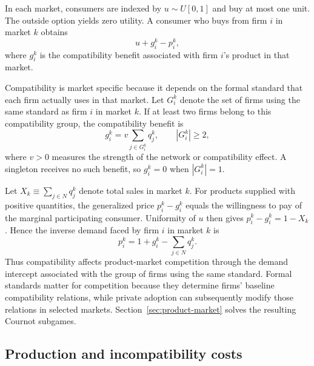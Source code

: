 In each market, consumers are indexed by $u\sim U[0,1]$ and buy at most one unit. The outside option yields zero utility. A consumer who buys from firm $i$ in market $k$ obtains
\begin{equation}
    u+g_i^k-p_i^k,
    \label{eq:consumer-utility}
\end{equation}
where $g_i^k$ is the compatibility benefit associated with firm $i$'s product in that market.

Compatibility is market specific because it depends on the formal standard that each firm actually uses in that market. Let $G_i^k$ denote the set of firms using the same standard as firm $i$ in market $k$. If at least two firms belong to this compatibility group, the compatibility benefit is
\begin{equation}
    g_i^k
    =v\sum_{j\in G_i^k}q_j^k,
    \qquad |G_i^k|\ge 2,
    \label{eq:compatibility-benefit}
\end{equation}
where $v>0$ measures the strength of the network or compatibility effect. A singleton receives no such benefit, so $g_i^k=0$ when $|G_i^k|=1$.

Let $X_k\equiv\sum_{j\in N}q_j^k$ denote total sales in market $k$. For products supplied with positive quantities, the generalized price $p_i^k-g_i^k$ equals the willingness to pay of the marginal participating consumer. Uniformity of $u$ then gives $p_i^k-g_i^k=1-X_k$. Hence the inverse demand faced by firm $i$ in market $k$ is
\begin{equation}
    p_i^k
    =1+g_i^k-\sum_{j\in N}q_j^k.
    \label{eq:inverse-demand}
\end{equation}
Thus compatibility affects product-market competition through the demand intercept associated with the group of firms using the same standard. Formal standards matter for competition because they determine firms' baseline compatibility relations, while private adoption can subsequently modify those relations in selected markets. Section~\ref{sec:product-market} solves the resulting Cournot subgames.

\subsection{Production and incompatibility costs}
\label{subsec:model-costs}

